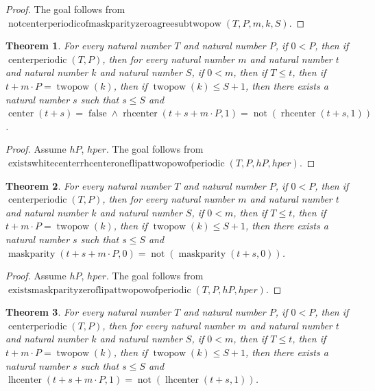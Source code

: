 \documentclass[11pt]{article}
\newtheorem{theorem}{Theorem}[section]
\theoremstyle{definition}
\begin{document}
\begin{proof}
The goal follows from \(\operatorname{notcenterperiodicofmaskparityzeroagreesubtwopow}(T, P, m, k, S)\).
\end{proof}
\begin{theorem}
\label{ll:paper:exists-white-center-rhcenter-one-flip-at-twopow-of-periodic}
For every natural number \(T\) and natural number \(P\), if \(0 < P\), then if \(\operatorname{centerperiodic}(T, P)\), then for every natural number \(m\) and natural number \(t\) and natural number \(k\) and natural number \(S\), if \(0 < m\), then if \(T \le t\), then if \(t + m \cdot P = \operatorname{twopow}(k)\), then if \(\operatorname{twopow}(k) \le S + 1\), then there exists a natural number \(s\) such that \(s \le S\) and \(\operatorname{center}(t + s) = \operatorname{false} \land \operatorname{rhcenter}(t + s + m \cdot P, 1) = \operatorname{not}(\operatorname{rhcenter}(t + s, 1))\).
\end{theorem}
\begin{proof}
Assume \(hP\), \(hper\).
The goal follows from \(\operatorname{existswhitecenterrhcenteroneflipattwopowofperiodic}(T, P, hP, hper)\).
\end{proof}
\begin{theorem}
\label{ll:paper:exists-maskparity-zero-flip-at-twopow-of-periodic}
For every natural number \(T\) and natural number \(P\), if \(0 < P\), then if \(\operatorname{centerperiodic}(T, P)\), then for every natural number \(m\) and natural number \(t\) and natural number \(k\) and natural number \(S\), if \(0 < m\), then if \(T \le t\), then if \(t + m \cdot P = \operatorname{twopow}(k)\), then if \(\operatorname{twopow}(k) \le S + 1\), then there exists a natural number \(s\) such that \(s \le S\) and \(\operatorname{maskparity}(t + s + m \cdot P, 0) = \operatorname{not}(\operatorname{maskparity}(t + s, 0))\).
\end{theorem}
\begin{proof}
Assume \(hP\), \(hper\).
The goal follows from \(\operatorname{existsmaskparityzeroflipattwopowofperiodic}(T, P, hP, hper)\).
\end{proof}
\begin{theorem}
\label{ll:paper:exists-lhcenter-one-flip-at-twopow-of-periodic}
For every natural number \(T\) and natural number \(P\), if \(0 < P\), then if \(\operatorname{centerperiodic}(T, P)\), then for every natural number \(m\) and natural number \(t\) and natural number \(k\) and natural number \(S\), if \(0 < m\), then if \(T \le t\), then if \(t + m \cdot P = \operatorname{twopow}(k)\), then if \(\operatorname{twopow}(k) \le S + 1\), then there exists a natural number \(s\) such that \(s \le S\) and \(\operatorname{lhcenter}(t + s + m \cdot P, 1) = \operatorname{not}(\operatorname{lhcenter}(t + s, 1))\).
\end{theorem}
\end{document}
